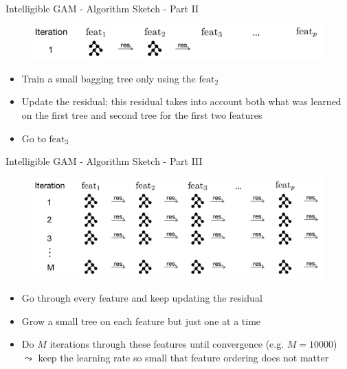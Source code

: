 \documentclass[11pt,compress,t,notes=noshow, aspectratio=169, xcolor=table]{beamer}
\begin{document}
\begin{frame}{Intelligible GAM - Algorithm Sketch - Part II}
\begin{figure}
    \centering
    \includegraphics[width=1\linewidth]{slides//02_interpretable-models//figure/EBM_Step2.png}
    \label{fig:Intelligible EBM_Step2}
\end{figure}
\begin{itemize}
    \item Train a small bagging tree only using the $\text{feat}_2$
    \item Update the residual; this residual takes into account both what was learned on the first tree and second tree for the first two features
    \item Go to $\text{feat}_3$
\end{itemize}

\end{frame}

\begin{frame}{Intelligible GAM - Algorithm Sketch - Part III}
\begin{figure}
    \centering
    \includegraphics[width=1\linewidth]{slides//02_interpretable-models//figure/EBM_Step3.png}
    \label{fig:Intelligible EBM_Step3}
\end{figure}
\begin{itemize}
    \item Go through every feature and keep updating the residual
    \item Grow a small tree on each feature but just one at a time
    \item Do $M$ iterations through these features until convergence (e.g. $M=10000$) \\
    $\leadsto$ keep the learning rate so small that feature ordering does not matter
\end{itemize}

\end{frame}
\end{document}
